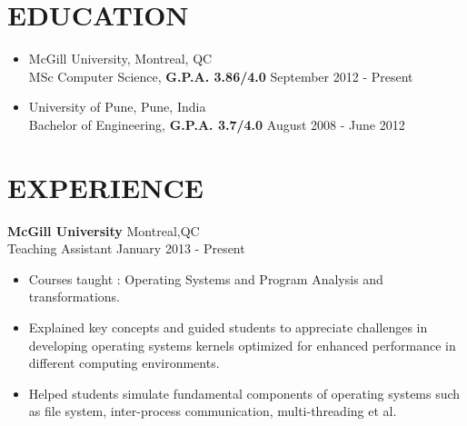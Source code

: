 \documentclass[11pt]{res} %
\begin{document}
 
 

 
                                             
\begin{resume}
                                               
 
 
\section{EDUCATION} 
\begin{itemize}
\item
\noindent McGill University,  \hfill \hfill Montreal, QC\\
\noindent MSc Computer Science, \textbf{G.P.A. 3.86/4.0}  \hfill \hfill September 2012 - Present
\item
\noindent University of Pune,  \hfill \hfill Pune, India\\
\noindent Bachelor of Engineering, \textbf{G.P.A. 3.7/4.0}  \hfill \hfill August 2008 - June 2012
\end{itemize}
\section{EXPERIENCE} 
\noindent \textbf{McGill University} \hfill \hfill Montreal,QC \\
\noindent Teaching Assistant \hfill \hfill January 2013 - Present
\begin{itemize}
\item Courses taught :  Operating Systems and Program Analysis and transformations.
\item Explained key concepts and guided students to appreciate challenges in developing operating systems kernels
optimized for enhanced performance in different computing environments.
\item Helped students simulate fundamental components of operating systems such as file system, inter-process
communication, multi-threading et al.
\end{itemize}


\end{resume}
\end{document}
